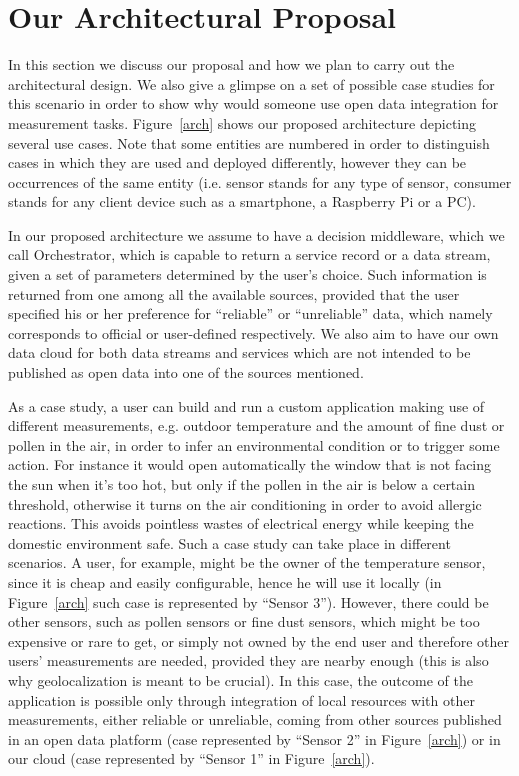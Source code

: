 \section{Our Architectural Proposal}
\label{sec:casestudy}
In this section we discuss our proposal and how we plan to carry out the architectural design.
We also give a glimpse on a set of possible case studies for this scenario in order to show why would someone use open data integration for measurement tasks.
Figure~\ref{arch} shows our proposed architecture depicting several use cases.
Note that some entities are numbered in order to distinguish cases in which they are used and deployed differently, however they can be occurrences of the same entity (i.e. sensor stands for any type of sensor, consumer stands for any client device such as a smartphone, a Raspberry Pi or a PC). 

In our proposed architecture we assume to have a decision middleware, which we call Orchestrator, which is capable to return a service record or a data stream, given a set of parameters determined by the user's choice.
Such information is returned from one among all the available sources, provided that the user specified his or her preference for ``reliable'' or ``unreliable'' data, which namely corresponds to official or user-defined respectively.
We also aim to have our own data cloud for both data streams and services which are not intended to be published as open data into one of the sources mentioned.

As a case study, a user can build and run a custom application making use of different measurements, e.g. outdoor temperature and the amount of fine dust or pollen in the air, in order to infer an environmental condition or to trigger some action.
For instance it would open automatically the window that is not facing the sun when it's too hot, but only if the pollen in the air is below a certain threshold, otherwise it turns on the air conditioning in order to avoid allergic reactions.
This avoids pointless wastes of electrical energy while keeping the domestic environment safe.
Such a case study can take place in different scenarios.
A user, for example, might be the owner of the temperature sensor, since it is cheap and easily configurable, hence he will use it locally (in Figure~\ref{arch} such case is represented by ``Sensor 3'').
However, there could be other sensors, such as pollen sensors or fine dust sensors, which might be too expensive or rare to get, or simply not owned by the end user and therefore other users' measurements are needed, provided they are nearby enough (this is also why geolocalization is meant to be crucial).
In this case, the outcome of the application is possible only through integration of local resources with other measurements, either reliable or unreliable, coming from other sources published in an open data platform (case represented by ``Sensor 2'' in Figure~\ref{arch}) or in our cloud (case represented by ``Sensor 1'' in Figure~\ref{arch}).%

